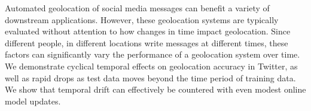 Automated geolocation of social media messages can benefit a variety of downstream applications. However, these geolocation systems are typically evaluated without attention to how changes in time impact geolocation. Since different people, in different locations write messages at different times, these factors can significantly vary the performance of a geolocation system over time. We demonstrate cyclical temporal effects on geolocation accuracy in Twitter, as well as rapid drops as test data moves beyond the time period of training data. We show that temporal drift can effectively be countered with even modest online model updates.
